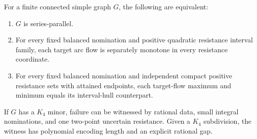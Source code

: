 \begin{theorem}
\label{thm:a-bound-characterization}
For a finite connected simple graph $G$, the following are equivalent:
\begin{enumerate}
\item $G$ is series-parallel.
\item For every fixed balanced nomination and positive quadratic
resistance interval family, each target arc flow is separately monotone
in every resistance coordinate.
\item For every fixed balanced nomination and independent compact
positive resistance sets with attained endpoints, each target-flow
maximum and minimum equals its interval-hull counterpart.
\end{enumerate}
If $G$ has a $K_4$ minor, failure can be witnessed by rational data,
small integral nominations, and one two-point uncertain resistance.
Given a $K_4$ subdivision, the witness has polynomial encoding length
and an explicit rational gap.
\end{theorem}

